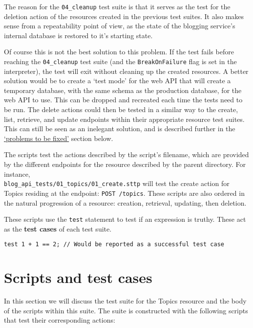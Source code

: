 The reason for the \verb|04_cleanup| test suite is that it serves as the test for the deletion action of the resources created in the previous test suites. It also makes sense from a repeatability point of view, as the state of the blogging service's internal database is restored to it's starting state.

Of course this is not the best solution to this problem. If the test fails before reaching the \verb|04_cleanup| test suite (and the \verb|BreakOnFailure| flag is set in the interpreter), the test will exit without cleaning up the created resources. A better solution would be to create a `test mode' for the web API that will create a temporary database, with the same schema as the production database, for the web API to use. This can be dropped and recreated each time the tests need to be run. The delete actions could then be tested in a similar way to the create, list, retrieve, and update endpoints within their appropriate resource test suites. This can still be seen as an inelegant solution, and is described further in the \hyperref[sec:hello-sttp-problems-to-be-fixed]{`problems to be fixed'} section below.

The scripts test the actions described by the script's filename, which are provided by the different endpoints for the resource described by the parent directory. For instance, \\\verb|blog_api_tests/01_topics/01_create.sttp| will test the create action for Topics residing at the endpoint: \verb|POST /topics|. These scripts are also ordered in the natural progression of a resource: creation, retrieval, updating, then deletion.

These scripts use the \verb|test| statement to test if an expression is truthy. These act as the \textbf{test cases} of each test suite.

\begin{verbatim}
test 1 + 1 == 2; // Would be reported as a successful test case
\end{verbatim}

\section{Scripts and test cases}

In this section we will discuss the test suite for the Topics resource and the body of the scripts within this suite. The suite is constructed with the following scripts that test their corresponding actions:


